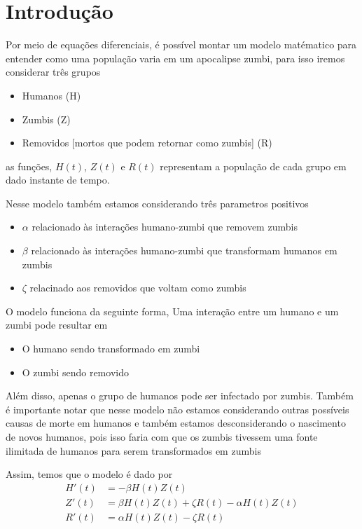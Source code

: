 \documentclass[xcolor=dvipsnames, aspectratio=169]{beamer}
\begin{document}
    \section{Introdução}
    \begin{frame}
        Por meio de equações diferenciais, é possível montar um modelo matématico para entender como uma população varia em um apocalipse zumbi, para isso iremos considerar três grupos
        \begin{itemize}[label=-]
            \item Humanos (H)
            \item Zumbis (Z)
            \item Removidos [mortos que podem retornar como zumbis] (R)
        \end{itemize}
        as funções, $H(t)$, $Z(t)$ e $R(t)$ representam a população de cada grupo em dado instante de tempo.
    \end{frame}
    \begin{frame}
        Nesse modelo também estamos considerando três parametros positivos
        \begin{itemize}[label=-]
            \item $\alpha$ relacionado às interações humano-zumbi que removem zumbis
            \item $\beta$ relacionado às interações humano-zumbi que transformam humanos em zumbis
            \item $\zeta$ relacinado aos removidos que voltam como zumbis
        \end{itemize}
    \end{frame}
    \begin{frame}
        O modelo funciona da seguinte forma, Uma interação entre um humano e um zumbi pode resultar em
        \begin{itemize}[label=-]
            \item O humano sendo transformado em zumbi
            \item O zumbi sendo removido
        \end{itemize}
        Além disso, apenas o grupo de humanos pode ser infectado por zumbis.
        Também é importante notar que nesse modelo não estamos considerando outras possíveis causas de morte em humanos e também estamos desconsiderando o nascimento de novos humanos, pois isso faria com que os zumbis tivessem uma fonte ilimitada de humanos para serem transformados em zumbis
    \end{frame}
    \begin{frame}
        Assim, temos que o modelo é dado por
        \begin{align*}
            H'(t) &= -\beta H(t) Z(t)\\
            Z'(t) &= \beta H(t) Z(t) + \zeta R(t) - \alpha H(t) Z(t)\\
            R'(t) &= \alpha H(t) Z(t) - \zeta R(t)
        \end{align*}
    \end{frame}
\end{document}
